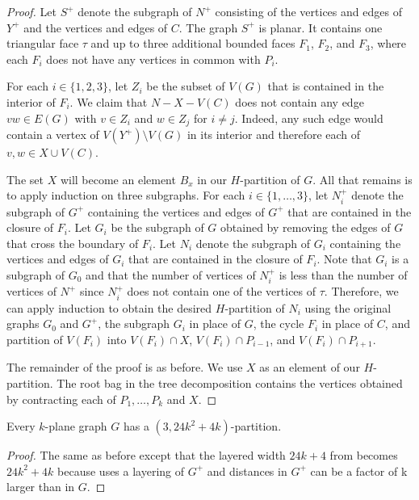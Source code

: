 \documentclass{patmorin}
\begin{document}
\begin{proof}
  Let $S^+$ denote the subgraph of $N^+$ consisting of the vertices and edges of $Y^+$ and the vertices and edges of $C$.  The graph $S^+$ is planar. It contains one triangular face $\tau$ and up to three additional bounded faces $F_1$, $F_2$, and $F_3$, where each $F_i$ does not have any vertices in common with $P_i$.
  
  For each $i\in\{1,2,3\}$, let $Z_i$ be the subset of $V(G)$ that is contained in the interior of $F_i$.  We claim that $N-X-V(C)$ does not contain any edge $vw\in E(G)$ with $v\in Z_i$ and $w\in Z_j$ for $i\neq j$.  Indeed, any such edge would contain a vertex of $V(Y^+)\setminus V(G)$ in its interior and therefore each of $v,w\in X\cup V(C)$.

  The set $X$ will become an element $B_x$ in our $H$-partition of $G$.  All that remains is to apply induction on three subgraphs.  For each $i\in\{1,\ldots,3\}$, let $N_i^+$ denote the subgraph of $G^+$ containing the vertices and edges of $G^+$ that are contained in the closure of $F_i$.  
  Let $G_i$ be the subgraph of $G$ obtained by removing the edges of $G$ that cross the boundary of $F_i$.  
  Let $N_i$ denote the subgraph of $G_i$ containing the vertices and edges of $G_i$ that are contained in the closure of $F_i$.  Note that $G_i$ is a subgraph of $G_0$ and that the number of vertices of $N_i^+$ is less than the number of vertices of $N^+$ since $N_i^+$ does not contain one of the vertices of $\tau$.  Therefore, we can apply induction to obtain the desired $H$-partition of $N_i$ using the original graphs $G_0$ and $G^+$, the subgraph $G_i$ in place of $G$, the cycle $F_i$ in place of $C$, and partition of $V(F_i)$ into $V(F_i)\cap X$, $V(F_i)\cap P_{i-1}$, and $V(F_i)\cap P_{i+1}$.
  
  The remainder of the proof is as before. We use $X$ as an element of our $H$-partition. The root bag in the tree decomposition contains the vertices obtained by contracting each of $P_1,\ldots,P_k$ and $X$.
\end{proof}


\begin{thm}
  Every $k$-plane graph $G$ has a $(3, 24k^2+4k)$-partition.
\end{thm}

\begin{proof}
  The same as before except that the layered width $24k+4$ from  becomes $24k^2+4k$ because  uses a layering of $G^+$ and distances in $G^+$ can be a factor of k larger than in $G$.
\end{proof}
\end{document}
